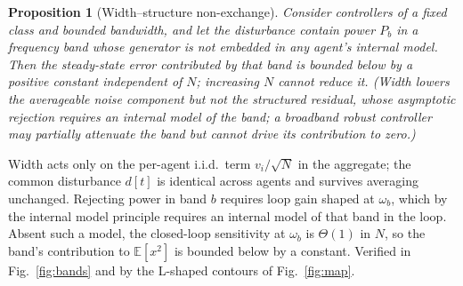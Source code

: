 \documentclass[journal]{IEEEtran}
\newtheorem{proposition}{Proposition}
\newcommand{\E}{\mathbb{E}}
\begin{document}
\begin{proposition}[Width--structure non-exchange]\label{prop:width}
Consider controllers of a fixed class and bounded bandwidth, and let the
disturbance contain power $P_b$ in a frequency band whose generator is not
embedded in any agent's internal model. Then the steady-state error contributed
by that band is bounded below by a positive constant independent of $N$;
increasing $N$ cannot reduce it. (Width lowers the \emph{averageable} noise
component but not the structured residual, whose \emph{asymptotic} rejection
requires an internal model of the band; a broadband robust controller may
partially attenuate the band but cannot drive its contribution to zero.)
\end{proposition}
\begin{IEEEproof}
Width acts only on the per-agent i.i.d.\ term $v_i/\sqrt{N}$ in the aggregate;
the common disturbance $d[t]$ is identical across agents and survives averaging
unchanged. Rejecting power in band $b$ requires loop gain shaped at $\omega_b$,
which by the internal model principle \cite{francis1976} requires an internal
model of that band in the loop. Absent such a model, the closed-loop sensitivity
at $\omega_b$ is $\Theta(1)$ in $N$, so the band's contribution to $\E[x^2]$ is
bounded below by a constant. Verified in Fig.~\ref{fig:bands} and by the
L-shaped contours of Fig.~\ref{fig:map}.
\end{IEEEproof}
\end{document}
